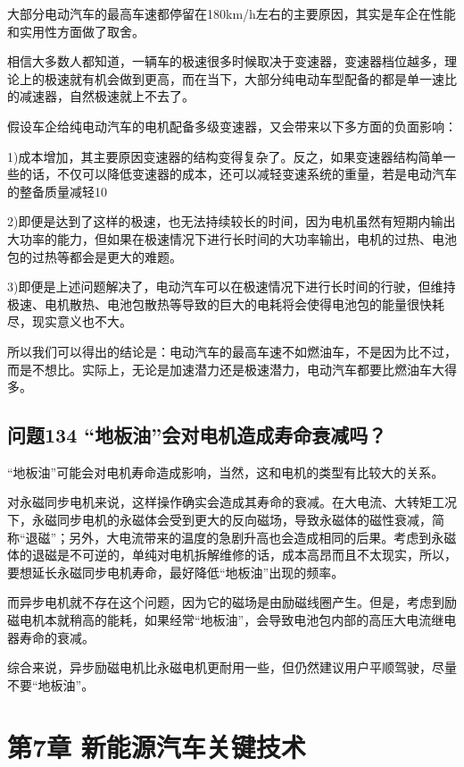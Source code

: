\documentclass[12pt,UTF8]{ctexbook}
\begin{document}
大部分电动汽车的最高车速都停留在180km/h左右的主要原因，其实是车企在性能和实用性方面做了取舍。

相信大多数人都知道，一辆车的极速很多时候取决于变速器，变速器档位越多，理论上的极速就有机会做到更高，而在当下，大部分纯电动车型配备的都是单一速比的减速器，自然极速就上不去了。

假设车企给纯电动汽车的电机配备多级变速器，又会带来以下多方面的负面影响：

1)成本增加，其主要原因变速器的结构变得复杂了。反之，如果变速器结构简单一些的话，不仅可以降低变速器的成本，还可以减轻变速系统的重量，若是电动汽车的整备质量减轻10%

2)即便是达到了这样的极速，也无法持续较长的时间，因为电机虽然有短期内输出大功率的能力，但如果在极速情况下进行长时间的大功率输出，电机的过热、电池包的过热等都会是更大的难题。

3)即便是上述问题解决了，电动汽车可以在极速情况下进行长时间的行驶，但维持极速、电机散热、电池包散热等导致的巨大的电耗将会使得电池包的能量很快耗尽，现实意义也不大。

所以我们可以得出的结论是：电动汽车的最高车速不如燃油车，不是因为比不过，而是不想比。实际上，无论是加速潜力还是极速潜力，电动汽车都要比燃油车大得多。

\section{问题134 “地板油”会对电机造成寿命衰减吗？}

“地板油”可能会对电机寿命造成影响，当然，这和电机的类型有比较大的关系。

对永磁同步电机来说，这样操作确实会造成其寿命的衰减。在大电流、大转矩工况下，永磁同步电机的永磁体会受到更大的反向磁场，导致永磁体的磁性衰减，简称“退磁”；另外，大电流带来的温度的急剧升高也会造成相同的后果。考虑到永磁体的退磁是不可逆的，单纯对电机拆解维修的话，成本高昂而且不太现实，所以，要想延长永磁同步电机寿命，最好降低“地板油”出现的频率。

而异步电机就不存在这个问题，因为它的磁场是由励磁线圈产生。但是，考虑到励磁电机本就稍高的能耗，如果经常“地板油”，会导致电池包内部的高压大电流继电器寿命的衰减。

综合来说，异步励磁电机比永磁电机更耐用一些，但仍然建议用户平顺驾驶，尽量不要“地板油”。

\chapter{第7章 新能源汽车关键技术}
\end{document}
